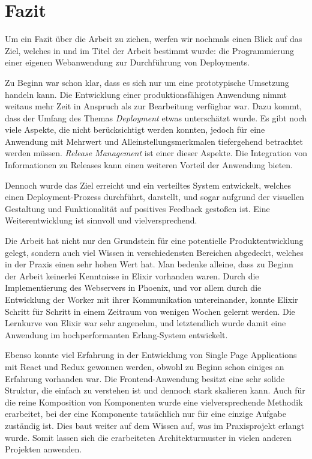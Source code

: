 \chapter{Fazit}

Um ein Fazit über die Arbeit zu ziehen, werfen wir nochmals einen Blick auf das Ziel, welches in  und im Titel der Arbeit bestimmt wurde: die Programmierung einer eigenen Webanwendung zur Durchführung von Deployments.

Zu Beginn war schon klar, dass es sich nur um eine prototypische Umsetzung handeln kann. Die Entwicklung einer produktionsfähigen Anwendung nimmt weitaus mehr Zeit in Anspruch als zur Bearbeitung verfügbar war. Dazu kommt, dass der Umfang des Themas \emph{Deployment} etwas unterschätzt wurde. Es gibt noch viele Aspekte, die nicht berücksichtigt werden konnten, jedoch für eine Anwendung mit Mehrwert und Alleinstellungsmerkmalen tiefergehend betrachtet werden müssen. \emph{Release Management} ist einer dieser Aspekte. Die Integration von Informationen zu Releases kann einen weiteren Vorteil der Anwendung bieten.

Dennoch wurde das Ziel erreicht und ein verteiltes System entwickelt, welches einen Deployment-Prozess durchführt, darstellt, und sogar aufgrund der visuellen Gestaltung und Funktionalität auf positives Feedback gestoßen ist. Eine Weiterentwicklung ist sinnvoll und vielversprechend.

Die Arbeit hat nicht nur den Grundstein für eine potentielle Produktentwicklung gelegt, sondern auch viel Wissen in verschiedensten Bereichen abgedeckt, welches in der Praxis einen sehr hohen Wert hat. Man bedenke alleine, dass zu Beginn der Arbeit keinerlei Kenntnisse in Elixir vorhanden waren. Durch die Implementierung des Webservers in Phoenix, und vor allem durch die Entwicklung der Worker mit ihrer Kommunikation untereinander, konnte Elixir Schritt für Schritt in einem Zeitraum von wenigen Wochen gelernt werden. Die Lernkurve von Elixir war sehr angenehm, und letztendlich wurde damit eine Anwendung im hochperformanten Erlang-System entwickelt.

Ebenso konnte viel Erfahrung in der Entwicklung von Single Page Applications mit React und Redux gewonnen werden, obwohl zu Beginn schon einiges an Erfahrung vorhanden war. Die Frontend-Anwendung besitzt eine sehr solide Struktur, die einfach zu verstehen ist und dennoch stark skalieren kann. Auch für die reine Komposition von Komponenten wurde eine vielversprechende Methodik erarbeitet, bei der eine Komponente tatsächlich nur für eine einzige Aufgabe zuständig ist. Dies baut weiter auf dem Wissen auf, was im Praxisprojekt erlangt wurde. Somit lassen sich die erarbeiteten Architekturmuster in vielen anderen Projekten anwenden.

